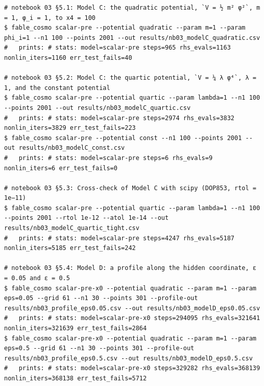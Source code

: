 \begin{Verbatim}
# notebook 03 §5.1: Model C: the quadratic potential, `V = ½ m² φ²`, m = 1, φ_i = 1, to x4 = 100
$ fable_cosmo scalar-pre --potential quadratic --param m=1 --param phi_i=1 --n1 100 --points 2001 --out results/nb03_modelC_quadratic.csv
#   prints: # stats: model=scalar-pre steps=965 rhs_evals=1163 nonlin_iters=1160 err_test_fails=40

# notebook 03 §5.2: Model C: the quartic potential, `V = ¼ λ φ⁴`, λ = 1, and the constant potential
$ fable_cosmo scalar-pre --potential quartic --param lambda=1 --n1 100 --points 2001 --out results/nb03_modelC_quartic.csv
#   prints: # stats: model=scalar-pre steps=2974 rhs_evals=3832 nonlin_iters=3829 err_test_fails=223
$ fable_cosmo scalar-pre --potential const --n1 100 --points 2001 --out results/nb03_modelC_const.csv
#   prints: # stats: model=scalar-pre steps=6 rhs_evals=9 nonlin_iters=6 err_test_fails=0

# notebook 03 §5.3: Cross-check of Model C with scipy (DOP853, rtol = 1e−11)
$ fable_cosmo scalar-pre --potential quartic --param lambda=1 --n1 100 --points 2001 --rtol 1e-12 --atol 1e-14 --out results/nb03_modelC_quartic_tight.csv
#   prints: # stats: model=scalar-pre steps=4247 rhs_evals=5187 nonlin_iters=5185 err_test_fails=242

# notebook 03 §5.4: Model D: a profile along the hidden coordinate, ε = 0.05 and ε = 0.5
$ fable_cosmo scalar-pre-x0 --potential quadratic --param m=1 --param eps=0.05 --grid 61 --n1 30 --points 301 --profile-out results/nb03_profile_eps0.05.csv --out results/nb03_modelD_eps0.05.csv
#   prints: # stats: model=scalar-pre-x0 steps=294095 rhs_evals=321641 nonlin_iters=321639 err_test_fails=2864
$ fable_cosmo scalar-pre-x0 --potential quadratic --param m=1 --param eps=0.5 --grid 61 --n1 30 --points 301 --profile-out results/nb03_profile_eps0.5.csv --out results/nb03_modelD_eps0.5.csv
#   prints: # stats: model=scalar-pre-x0 steps=329282 rhs_evals=368139 nonlin_iters=368138 err_test_fails=5712


\end{Verbatim}
